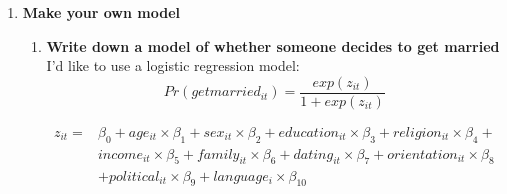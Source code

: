 \documentclass[11pt, oneside]{article}
\begin{document}
\begin{enumerate}
\begin{enumerate} [label=(\alph*)]
\end{enumerate}
\pagebreak
\item \textbf{Make your own model}
\begin{enumerate} [label=(\alph*)]
\item \textbf{Write down a model of whether someone decides to get married}\\
I'd like to use a logistic regression model: \\
$$ Pr(getmarried_{it}) = \frac{exp(z_{it})}{1+exp(z_{it})} $$

\begin{align*} z_{it} = & \beta _0 + age_{it} \times \beta _1 + sex_{it} \times \beta _2 + education_{it} \times \beta _3 + religion_{it} \times \beta _4 + \\ & income_{it} \times \beta _5 + family_{it} \times \beta _6 + dating_{it} \times \beta _7 + orientation_{it} \times \beta _8 \\
&+ political_{it} \times \beta _9   + language_{i} \times \beta _10   \end{align*}


\end{enumerate}
\end{enumerate}
\end{document}
